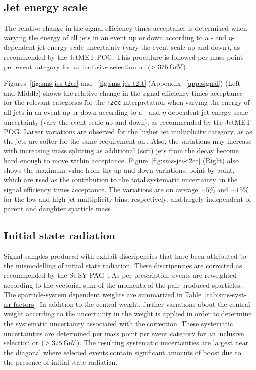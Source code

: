 \subsection{Jet energy scale\label{sec:sms-syst-jes}}

The relative change in the signal efficiency times acceptance is
determined when varying the energy of all jets in an event up or down
according to a \pt- and $\eta$-dependent jet energy scale uncertainty
(\ie vary the event scale up and down), as recommended by the JetMET
POG. This procedure is followed per mass point per event category for
an inclusive selection on \scalht ($> 375\,\text{Ge\hspace{-.08em}V}$). 

Figures~\ref{fig:sms-jes-t2cc} and ~\ref{fig:sms-jes-t2tt} 
(Appendix ~\ref{app:signal}) (Left and Middle) shows the relative
change in the signal efficiency times acceptance for the relevant
categories for the \verb!T2cc! interpretation when varying the energy
of all jets in an event up or down according to a \pt- and
$\eta$-dependent jet energy scale uncertainty (\ie vary the event
scale up and down), as recommended by the JetMET POG. Larger
variations are observed for the higher jet multiplicity category, as
as the jets are softer for the same requirement on \scalht. Also, the
variations may increase with increasing mass splitting as additional
(soft) jets from the decay become hard enough to move within
acceptance. Figure~\ref{fig:sms-jes-t2cc} (Right) also shows the
maximum value from the up and down variations, point-by-point, which
are used as the contribution to the total systematic uncertainty on
the signal efficiency times acceptance. The variations are on average
$\sim5\%$ and $\sim15\%$ for the low and high jet multiplicity bins,
respectively, and largely independent of parent and daughter sparticle
mass. 

\subsection{Initial state radiation\label{sec:sms-syst-isr}}

Signal samples produced with \MADGRAPH exhibit discripencies that 
have been attributed to the mismodelling of initial state radiation.
These discripencies are corrected as recommended by the SUSY 
PAG~\cite{susy-isrrw}. As per prescripton, events are reweighted
according to the vectorial sum of the momenta of the pair-produced
sparticles. The sparticle-system \Pt dependent weights are summarized in  
Table~\ref{tab:sms-syst-isr-factors}.   In addition to the central weight, 
further variations about the central weight according to the uncertainty 
in the weight is applied in order to determine the systematic uncertainty
associated with the correction. These systematic uncertainties are determined per
mass point per event category for an inclusive selection on \scalht
($> 375\,\text{Ge\hspace{-.08em}V}$).
The resulting systematic uncertainties are largest near the diagonal
where selected events contain significant amounts of boost due to the
presence of initial state radiation. 

